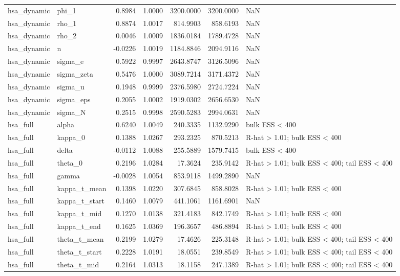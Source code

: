 \begin{tabular}{llrrrrl}
hsa\_dynamic & phi\_1 & 0.8984 & 1.0000 & 3200.0000 & 3200.0000 & NaN \\
hsa\_dynamic & rho\_1 & 0.8874 & 1.0017 & 814.9903 & 858.6193 & NaN \\
hsa\_dynamic & rho\_2 & 0.0046 & 1.0009 & 1836.0184 & 1789.4728 & NaN \\
hsa\_dynamic & n & -0.0226 & 1.0019 & 1184.8846 & 2094.9116 & NaN \\
hsa\_dynamic & sigma\_e & 0.5922 & 0.9997 & 2643.8747 & 3126.5096 & NaN \\
hsa\_dynamic & sigma\_zeta & 0.5476 & 1.0000 & 3089.7214 & 3171.4372 & NaN \\
hsa\_dynamic & sigma\_u & 0.1948 & 0.9999 & 2376.5980 & 2724.7224 & NaN \\
hsa\_dynamic & sigma\_eps & 0.2055 & 1.0002 & 1919.0302 & 2656.6530 & NaN \\
hsa\_dynamic & sigma\_N & 0.2515 & 0.9998 & 2590.5283 & 2994.0631 & NaN \\
hsa\_full & alpha & 0.6240 & 1.0049 & 240.3335 & 1132.9290 & bulk ESS < 400 \\
hsa\_full & kappa\_0 & 0.1388 & 1.0267 & 293.2325 & 870.5213 & R-hat > 1.01; bulk ESS < 400 \\
hsa\_full & delta & -0.0112 & 1.0088 & 255.5889 & 1579.7415 & bulk ESS < 400 \\
hsa\_full & theta\_0 & 0.2196 & 1.0284 & 17.3624 & 235.9142 & R-hat > 1.01; bulk ESS < 400; tail ESS < 400 \\
hsa\_full & gamma & -0.0028 & 1.0054 & 853.9118 & 1499.2890 & NaN \\
hsa\_full & kappa\_t\_mean & 0.1398 & 1.0220 & 307.6845 & 858.8028 & R-hat > 1.01; bulk ESS < 400 \\
hsa\_full & kappa\_t\_start & 0.1460 & 1.0079 & 441.1061 & 1161.6901 & NaN \\
hsa\_full & kappa\_t\_mid & 0.1270 & 1.0138 & 321.4183 & 842.1749 & R-hat > 1.01; bulk ESS < 400 \\
hsa\_full & kappa\_t\_end & 0.1625 & 1.0369 & 196.3657 & 486.8894 & R-hat > 1.01; bulk ESS < 400 \\
hsa\_full & theta\_t\_mean & 0.2199 & 1.0279 & 17.4626 & 225.3148 & R-hat > 1.01; bulk ESS < 400; tail ESS < 400 \\
hsa\_full & theta\_t\_start & 0.2228 & 1.0191 & 18.0551 & 239.8549 & R-hat > 1.01; bulk ESS < 400; tail ESS < 400 \\
hsa\_full & theta\_t\_mid & 0.2164 & 1.0313 & 18.1158 & 247.1389 & R-hat > 1.01; bulk ESS < 400; tail ESS < 400 \\

\end{tabular}
